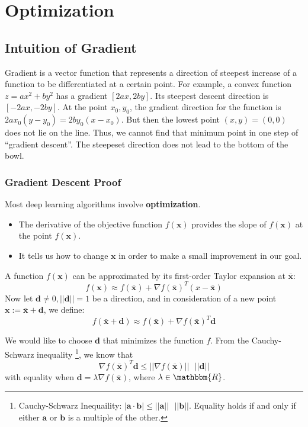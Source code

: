 \chapter{Optimization}
\label{ch:optimization}

\section{Intuition of Gradient}

Gradient is a vector function that represents a direction of steepest increase of a function to be differentiated at a certain point. For example, a convex function $z = ax^2+by^2$ has a gradient $[2ax, 2by]$. Its steepest descent direction is $[-2ax, -2by]$. At the point $x_0,y_0$, the gradient direction for the function is $2ax_0(y-y_0) = 2by_0(x-x_0)$. But then the lowest point $(x,y) = (0,0)$ does not lie on the line. Thus, we cannot find that minimum point in one step of ``gradient descent''. The steepeset direction does not lead to the bottom of the bowl. 

\subsection{Gradient Descent Proof}

Most deep learning algorithms involve \textbf{optimization}.

\begin{itemize}
	\item The derivative of the objective function $f(\mathbf{x})$ provides the slope of $f(\mathbf{x})$ at the point $f(\mathbf{x})$.
	\item It tells us how to change $\mathbf{x}$ in order to make a small improvement in our goal.
\end{itemize}

	A function $f(\mathbf{x})$ can be approximated by its first-order Taylor expansion at $\bar{\mathbf{x}}$:
	$$f(\mathbf{x})\approx f(\bar{\mathbf{x}})+\nabla f(\bar{\mathbf{x}})^T(x-\bar{\mathbf{x}})$$
	Now let $\mathbf{d}\neq0, ||\mathbf{d}||=1$ be a direction, and in consideration of a new point $\mathbf{x}:=\bar{\mathbf{x}}+\mathbf{d}$, we define:
	$$f(\bar{\mathbf{x}}+\mathbf{d})\approx f(\bar{\mathbf{x}})+\nabla f(\bar{\mathbf{x}})^T\mathbf{d}$$

We would like to choose $\mathbf{d}$ that minimizes the function $f$. From the Cauchy-Schwarz inequality \footnote{Cauchy-Schwarz Inequaility: $|\mathbf{a}\cdot \mathbf{b}|\leq ||\mathbf{a}||\textrm{ } ||\mathbf{b}||$. Equality holds if and only if either $\mathbf{a}$ or $\mathbf{b}$ is a multiple of the other.}, we know that
$$\nabla f(\bar{\mathbf{x}})^T\mathbf{d}\leq ||\nabla f(\bar{\mathbf{x}})||\textrm{ }||\mathbf{d}||$$
with equality when $\mathbf{d}=\lambda \nabla f(\bar{\mathbf{x}})$, where $\lambda\in \mathbbm{R}$.

